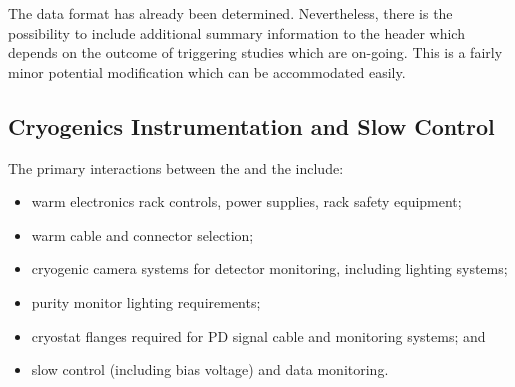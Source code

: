 The data format has already been determined. Nevertheless, there is the possibility to include additional summary information to the header which depends on the outcome of triggering studies which are on-going. This is a fairly minor potential modification which can be accommodated easily.



\subsection{Cryogenics Instrumentation and Slow Control}
\label{sec:fdsp-pd-intfc-xeon}

The primary interactions between the  and the  include:

\begin{itemize}
    \item warm electronics rack controls, power supplies, rack safety equipment;
    \item warm cable and connector selection;
    \item cryogenic camera systems for detector monitoring, including lighting systems;
    \item purity monitor lighting requirements;
    \item cryostat flanges required for PD signal cable and monitoring systems; and
    \item {} slow control (including bias voltage) and data monitoring.
\end{itemize}

